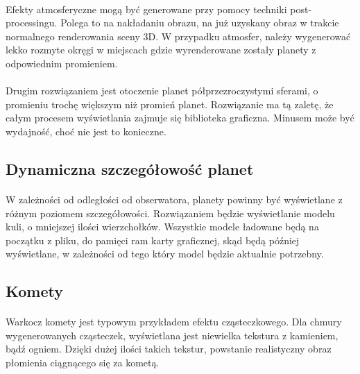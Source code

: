 \paragraph{}

Efekty atmosferyczne mogą być generowane przy pomocy techniki post-processingu. Polega to na nakładaniu obrazu, na już uzyskany obraz w trakcie normalnego renderowania sceny 3D. W przypadku atmosfer, należy wygenerować lekko rozmyte okręgi w miejscach gdzie wyrenderowane zostały planety z odpowiednim promieniem.

\paragraph{}

Drugim rozwiązaniem jest otoczenie planet półprzezroczystymi sferami, o promieniu trochę większym niż promień planet. Rozwiązanie ma tą zaletę, że całym procesem wyświetlania zajmuje się biblioteka graficzna. Minusem może być wydajność, choć nie jest to konieczne.


\subsection{Dynamiczna szczegółowość planet}\label{sub:dynamiczna szczegolowosc planet}

\paragraph{}

W zależności od odległości od obserwatora, planety powinny być wyświetlane z różnym poziomem szczegółowości. Rozwiązaniem będzie wyświetlanie modelu kuli, o mniejszej ilości wierzchołków. Wszystkie modele ładowane będą na początku z pliku, do pamięci ram karty graficznej, skąd będą później wyświetlane, w zależności od tego który model będzie aktualnie potrzebny.

\subsection{Komety}\label{sub:komety}

\paragraph{}

Warkocz komety jest typowym przykładem efektu cząsteczkowego. Dla chmury wygenerowanych cząsteczek, wyświetlana jest niewielka tekstura z kamieniem, bądź ogniem. Dzięki dużej ilości takich tekstur, powstanie realistyczny obraz płomienia ciągnącego się za kometą.

